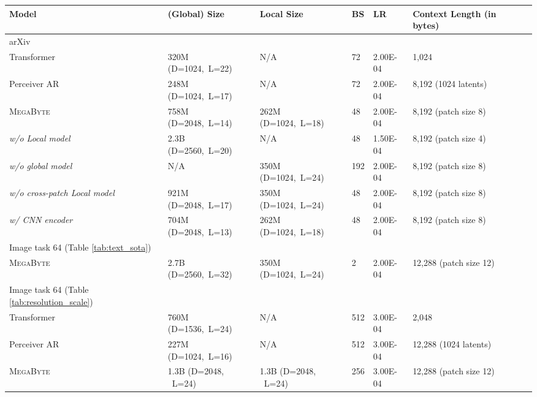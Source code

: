 \documentclass{article}
\newcommand{\fastslow}[0]{\textsc{MegaByte}\xspace}
\newcommand{\megabyte}[0]{\fastslow}
\theoremstyle{plain}
\theoremstyle{definition}
\theoremstyle{remark}
\begin{document}
\newpage

\begin{table}[h]
\centering
\small
\begin{tabular}{llllllll}
\toprule
Model & (Global) Size & Local Size  & BS & LR  & Context Length (in bytes) \\ 
\midrule
arXiv \\
\midrule
Transformer & 320M (D=1024,~L=22) & N/A  & 72 & 2.00E-04 & 1,024  \\
Perceiver AR  & 248M (D=1024,~L=17) & N/A &  72  & 2.00E-04 & 8,192 (1024 latents)   \\
\megabyte  & 758M (D=2048,~L=14) & 262M (D=1024,~L=18)  &  48  &  2.00E-04 &  8,192 (patch size 8) \\
\hspace{5pt} \textit{w/o Local model} & 2.3B (D=2560,~L=20) & N/A  &  48  &  1.50E-04 &  8,192 (patch size 4) \\
\hspace{5pt} \textit{w/o global model}  & N/A & 350M (D=1024,~L=24)  &  192  &  2.00E-04 &  8,192 (patch size 8) \\
\hspace{5pt} \textit{w/o cross-patch Local model}  & 921M (D=2048,~L=17) & 350M (D=1024,~L=24)  &  48  &  2.00E-04 &  8,192 (patch size 8) \\
\hspace{5pt} \textit{w/ CNN encoder}  & 704M  (D=2048,~L=13) & 262M (D=1024,~L=18)  &  48  &  2.00E-04 &  8,192 (patch size 8) \\

\midrule
Image task 64 (Table \ref{tab:text_sota}) \\
\midrule
\megabyte & 2.7B (D=2560,~L=32) & 350M (D=1024,~L=24)  &  2  &  2.00E-04 &  12,288 (patch size 12)  \\

\midrule
Image task 64 (Table \ref{tab:resolution_scale}) \\
\midrule
Transformer & 760M (D=1536,~L=24) & N/A  &  512  &  3.00E-04 &  2,048  \\
Perceiver AR &  227M (D=1024,~L=16) & N/A  & 512 & 3.00E-04 &  12,288 (1024 latents)  \\
\megabyte & 1.3B (D=2048, ~L=24) & 1.3B (D=2048, ~L=24) &  256 & 3.00E-04  &    12,288 (patch size 12) \\


\end{tabular}
\end{table}
\end{document}
